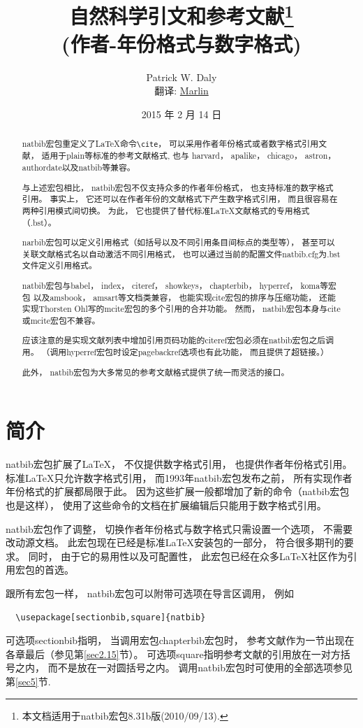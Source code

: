 \documentclass[a4paper,12pt,hyperref]{ctexart}
\title{自然科学引文和参考文献\thanks{本文档适用于natbib宏包8.31b版(2010/09/13).}\\
 \normalsize (作者-年份格式与数字格式)
}
\author{Patrick W. Daly \\ \normalsize 翻译: \href{mailto:yjccjlu@gmail.com}{Marlin}}
\date{2015 年 2 月 14 日}
\newcommand{\secref}[1]{第\ref{#1}节}
\begin{document}
\maketitle
\begin{abstract}
  natbib宏包重定义了\LaTeX{}命令\verb|\cite|， 可以采用作者年份格式或者数字格式引用文献，
   适用于plain等标准的参考文献格式,
   也与 harvard， apalike， chicago， astron， authordate以及natbib等兼容。

  与上述宏包相比， natbib宏包不仅支持众多的作者年份格式， 也支持标准的数字格式引用。
  事实上， 它还可以在作者年份的文献格式下产生数字格式引用， 而且很容易在两种引用模式间切换。
  为此， 它也提供了替代标准\LaTeX{}文献格式的专用格式（.bst）。

  narbib宏包可以定义引用格式（如括号以及不同引用条目间标点的类型等），
   甚至可以关联文献格式名以自动激活不同引用格式，
   也可以通过当前的配置文件natbib.cfg为.bst文件定义引用格式。

  natbib宏包与babel， index， citeref， showkeys， chapterbib， hyperref， koma等宏包
   以及amsbook， amsart等文档类兼容，
   也能实现cite宏包的排序与压缩功能， 还能实现Thorsten Ohl写的mcite宏包的多个引用的合并功能。
  然而， natbib宏包本身与cite或mcite宏包不兼容。

  应该注意的是实现文献列表中增加引用页码功能的citeref宏包必须在natbib宏包之后调用。
  （调用hyperref宏包时设定pagebackref选项也有此功能， 而且提供了超链接。）

  此外， natbib宏包为大多常见的参考文献格式提供了统一而灵活的接口。
\end{abstract}
\newpage
\tableofcontents
\newpage

\section{简介}
natbib宏包扩展了\LaTeX{}， 不仅提供数字格式引用，
 也提供作者年份格式引用。
标准\LaTeX{}只允许数字格式引用， 而1993年natbib宏包发布之前，
 所有实现作者年份格式的扩展都局限于此。
因为这些扩展一般都增加了新的命令（natbib宏包也是这样），
 使用了这些命令的文档在扩展编辑后只能用于数字格式引用。

natbib宏包作了调整， 切换作者年份格式与数字格式只需设置一个选项，
 不需要改动源文档。
此宏包现在已经是标准\LaTeX{}安装包的一部分， 符合很多期刊的要求。
同时， 由于它的易用性以及可配置性，
 此宏包已经在众多\LaTeX{}社区作为引用宏包的首选。

跟所有宏包一样， natbib宏包可以附带可选项在导言区调用， 例如%
\begin{verbatim}
  \usepackage[sectionbib,square]{natbib}
\end{verbatim}
可选项sectionbib指明， 当调用宏包chapterbib宏包时，
 参考文献作为一节出现在各章最后（参见\secref{sec2.15}）。
可选项square指明参考文献的引用放在一对方括号之内， 而不是放在一对圆括号之内。
调用natbib宏包时可使用的全部选项参见\secref{sec5}.
\end{document}
